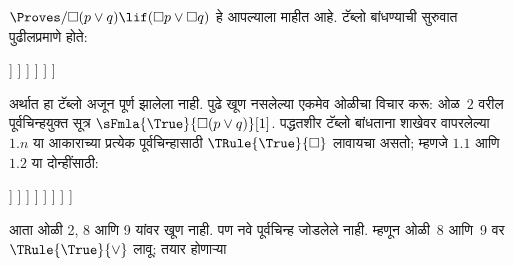 \begin{ex}
  $\Proves/ \Box(p \lor q) \lif (\Box p \lor \Box
  q)$ हे आपल्याला माहीत आहे. टॅब्लो बांधण्याची
  सुरुवात पुढीलप्रमाणे होते:
  \begin{oltableau}
    [\pFmla{\False}{\Box(p \lor q) \lif (\Box p \lor \Box q)}{1},
      just = \TAss, checked
      [\pFmla{\True}{\Box(p \lor q)}{1},
        just = {\TRule{\False}{\lif}[1]},
        [\pFmla{\False}{\Box p \lor \Box q}{1},
          just = {\TRule{\False}{\lif}[1]}, checked
          [\pFmla{\False}{\Box p}{1},
            just = {\TRule{\False}{\lor}[3]}, checked
            [\pFmla{\False}{\Box q}{1},
              just = {\TRule{\False}{\lor}[3]}, checked
              [\pFmla{\False}{p}{1.1},
                just = {\TRule{\False}{\Box}[4]}, checked
                [\pFmla{\False}{q}{1.2},
                  just = {\TRule{\False}{\Box}[5]}, checked
                ]
              ]
            ]
          ]
        ]
      ]
    ]
  \end{oltableau}
  अर्थात हा टॅब्लो अजून पूर्ण झालेला नाही.
  पुढे खूण नसलेल्या एकमेव ओळीचा विचार करू:
  ओळ~$2$ वरील पूर्वचिन्हयुक्त सूत्र
  $\sFmla{\True}{\Box(p \lor q)}[1]$.
  पद्धतशीर टॅब्लो बांधताना शाखेवर वापरलेल्या
  $1.n$ या आकाराच्या प्रत्येक पूर्वचिन्हासाठी
  $\TRule{\True}{\Box}$ लावायचा असतो;
  म्हणजे $1.1$ आणि $1.2$ या दोन्हींसाठी:
  \begin{oltableau}
    [\pFmla{\False}{\Box(p \lor q) \lif (\Box p \lor \Box q)}{1},
      just = \TAss, checked
      [\pFmla{\True}{\Box(p \lor q)}{1},
        just = {\TRule{\False}{\lif}[1]},
        [\pFmla{\False}{\Box p \lor \Box q}{1},
          just = {\TRule{\False}{\lif}[1]}, checked
          [\pFmla{\False}{\Box p}{1},
            just = {\TRule{\False}{\lor}[3]}, checked
            [\pFmla{\False}{\Box q}{1},
              just = {\TRule{\False}{\lor}[3]}, checked
              [\pFmla{\False}{p}{1.1},
                just = {\TRule{\False}{\Box}[4]}, checked
                [\pFmla{\False}{q}{1.2},
                  just = {\TRule{\False}{\Box}[5]}, checked
                  [\pFmla{\True}{p \lor q}{1.1},
                    just = {\TRule{\True}{\Box}[2]}
                    [\pFmla{\True}{p \lor q}{1.2},
                      just = {\TRule{\True}{\Box}[2]}
                    ]
                  ]
                ]
              ]
            ]
          ]
        ]
      ]
    ]
  \end{oltableau}
  आता ओळी 2, 8 आणि 9 यांवर खूण नाही.
  पण नवे पूर्वचिन्ह जोडलेले नाही. म्हणून
  ओळी~8 आणि~9 वर
  $\TRule{\True}{\lor}$ लावू; तयार होणाऱ्या

\end{ex}
